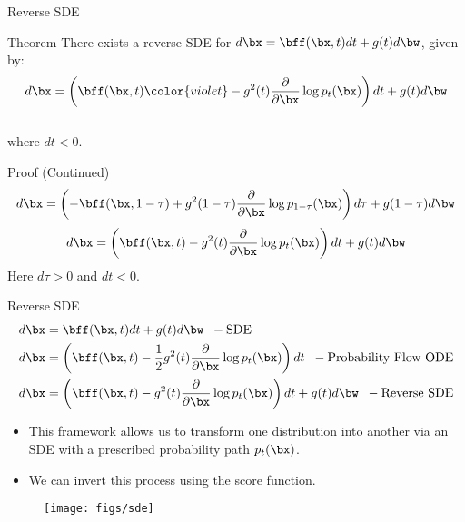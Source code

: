 \documentclass{beamer}
\begin{document}
\begin{frame}{Reverse SDE}
	\begin{block}{Theorem}
		There exists a reverse SDE for $d\bx = \bff(\bx, t) dt + g(t) d \bw$, given by:
		\vspace{-0.3cm}
		\[
			d\bx = \left(\bff(\bx, t) {\color{violet}- g^2(t) \frac{\partial}{\partial \bx}\log p_t(\bx)}\right) dt + g(t) d \bw
		\]
		\vspace{-0.5cm}\\
		where $dt<0$.
	\end{block}
	\begin{block}{Proof (Continued)}
		\vspace{-0.7cm}
		\[
			d\bx = \left(-\bff(\bx, 1 - \tau) + g^2(1 - \tau) \frac{\partial}{\partial \bx} \log p_{1 - \tau}(\bx) \right)d\tau + g(1 - \tau) d \bw
		\]
		\eqpause
		\[
			d\bx = \left(\bff(\bx, t) - g^2(t) \frac{\partial}{\partial \bx}\log p_t(\bx)\right)dt + g(t) d\bw
		\]
		Here $d\tau > 0$ and $dt < 0$.
	\end{block}
\end{frame}
\begin{frame}{Reverse SDE}
	\vspace{-0.3cm}
	\begin{align*}
		d\bx &= \bff(\bx, t) dt + g(t) d \bw \;\; - \text{SDE} \\
		d\bx &= \left(\bff(\bx, t) -\frac{1}{2} g^2(t) \frac{\partial}{\partial \bx} \log p_t(\bx) \right) dt \;\; - \text{Probability Flow ODE} \\
		d\bx &= \left(\bff(\bx, t) - g^2(t) \frac{\partial}{\partial \bx}\log p_t(\bx)\right) dt + g(t) d \bw \;\; - \text{Reverse SDE}
	\end{align*}
	\eqpause
	\vspace{-0.7cm}
	\begin{itemize}
		\item This framework allows us to transform one distribution into another via an SDE with a prescribed probability path $p_t(\bx)$.
		\item We can invert this process using the score function.
	\end{itemize}
	\vspace{-0.3cm}
	\begin{figure}
		\texttt{[image: figs/sde]}
	\end{figure}
\end{frame}
\end{document}
